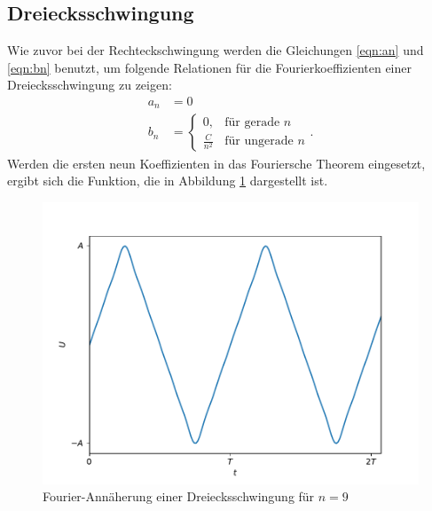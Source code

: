 \subsection{Dreiecksschwingung}
Wie zuvor bei der Rechteckschwingung werden die Gleichungen \eqref{eqn:an} und \eqref{eqn:bn} benutzt, um folgende Relationen für die Fourierkoeffizienten einer Dreiecksschwingung zu zeigen:
\begin{align*}
    a_n &= 0 \\
    b_n &= 
    \begin{cases}
    0 ,     & \text {für gerade $n$} \\
    \frac{C}{n^2} & \text {für ungerade $n$}
    \end{cases} .
\end{align*}
Werden die ersten neun Koeffizienten in das Fouriersche Theorem eingesetzt, ergibt sich die Funktion, die in Abbildung \ref{fig:vorbereitung_dreieck} dargestellt ist.
\begin{figure}[h]
  \centering
  \includegraphics[width=\textwidth]{assets/fourier_dreieck.pdf}
  \caption{Fourier-Annäherung einer Dreiecksschwingung für $n=9$}
  \label{fig:vorbereitung_dreieck}
\end{figure}
